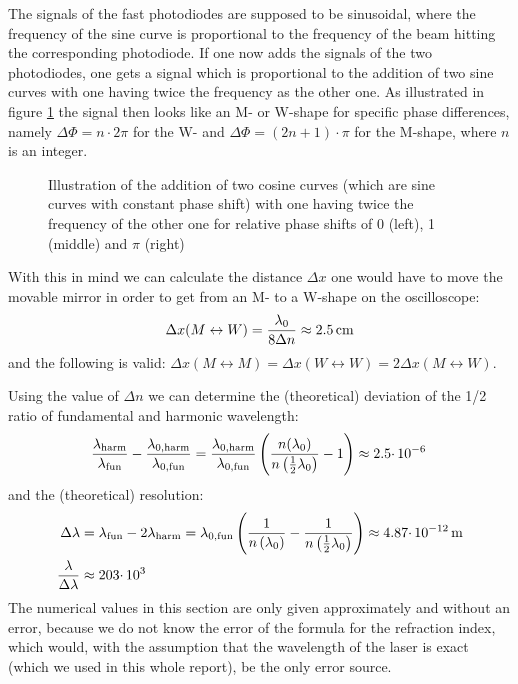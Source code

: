 \documentclass{protokoll_en}
\begin{document}
The signals of the fast photodiodes are supposed to be sinusoidal, where the frequency of the sine curve is proportional to the frequency of the beam hitting the corresponding photodiode. If one now adds the signals of the two photodiodes, one gets a signal which is proportional to the addition of two sine curves with one having twice the frequency as the other one. As illustrated in figure \ref{fig:ana_sines} the signal then looks like an M- or W-shape for specific phase differences, namely $\Delta \Phi = n\cdotp 2\pi$ for the W- and $\Delta \Phi = (2n+1)\cdotp\pi$ for the M-shape, where $n$ is an integer.
\begin{figure}[H]
\begin{floatrow}
\resizebox{0.33\textwidth}{!}{
 
}
\resizebox{0.33\textwidth}{!}{
 
}
\resizebox{0.33\textwidth}{!}{
 
}
\end{floatrow}
\caption{Illustration of the addition of two cosine curves (which are sine curves with constant phase shift) with one having twice the frequency of the other one for relative phase shifts of 0 (left), 1 (middle) and $\pi$ (right)}
\label{fig:ana_sines}
\end{figure}
With this in mind we can calculate the distance $\Delta x$ one would have to move the movable mirror in order to get from an M- to a W-shape on the oscilloscope:
\begin{align}
\Delta x (M\leftrightarrow W) = \frac{\lambda_0}{8\Delta n} \approx \unit[2.5]{cm}
\end{align}
and the following is valid: $\Delta x (M\leftrightarrow M) = \Delta x (W\leftrightarrow W) = 2\Delta x (M\leftrightarrow W)$.

Using the value of $\Delta n$ we can determine the (theoretical) deviation of the 1/2 ratio of fundamental and harmonic wavelength:
\begin{align}
\frac{\lambda_\textrm{harm}}{\lambda_\textrm{fun}} - \frac{\lambda_{0,\textrm{harm}}}{\lambda_{0,\textrm{fun}}} = \frac{\lambda_{0,\textrm{harm}}}{\lambda_{0,\textrm{fun}}}\left(\frac{n(\lambda_0)}{n\left(\frac{1}{2}\lambda_0\right)}-1\right)\approx \unit[2.5\cdotp 10^{-6}]{}
\end{align}
and the (theoretical) resolution:
\begin{align}
\Delta \lambda &= \lambda_\textrm{fun}-2\lambda_\textrm{harm}=\lambda_{0,\textrm{fun}}\left(\frac{1}{n\left(\lambda_0\right)}-\frac{1}{n\left(\frac{1}{2}\lambda_0\right)}\right)\approx \unit[4.87\cdotp 10^{-12}]{m}\\
\notag\frac{\lambda}{\Delta \lambda} &\approx 203\cdotp 10^{3}
\end{align}
The numerical values in this section are only given approximately and without an error, because we do not know the error of the formula for the refraction index, which would, with the assumption that the wavelength of the laser is exact (which we used in this whole report), be the only error source.
\end{document}
